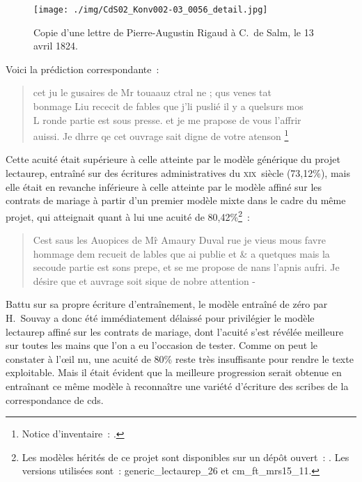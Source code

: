 \documentclass[a4paper,12pt,twoside]{book}
\newcommand{\siecle}[1]{\textsc{#1}\ieme}
\begin{document}
				\begin{figure}[!h]
					\centering
					\texttt{[image: ./img/CdS02\_Konv002-03\_0056\_detail.jpg]}%
					\caption{Copie d'une lettre de Pierre-Augustin Rigaud à C.~de Salm, le 13 avril 1824.}%
					\label{lettre-rigaud}%
				\end{figure}
				
				Voici la \gls{prédiction} correspondante~:
				
				\begin{quote}
					\textsf{cet ju le gusaires de Mr touaauz ctral ne ; qus venes tat\\
					bonmage Liu rececit de fables que j'li puslié il y a quelsurs mos\\
					L ronde partie est sous presse. et je me prapose de vous l'affrir\\
					auissi. Je dhrre qe cet ouvrage sait digne de votre atenson
					\footnote{Notice d'inventaire~: \cite{CdS02056}.}}
				\end{quote}
				
				Cette acuité était supérieure à celle atteinte par le modèle générique du projet \gls{lectaurep}, entraîné sur des écritures administratives du \siecle{xix}~siècle (73,12\%), mais elle était en revanche inférieure à celle atteinte par le modèle affiné sur les contrats de mariage à partir d'un premier modèle mixte dans le cadre du même projet, qui atteignait quant à lui une acuité de 80,42\%\footnote{Les modèles hérités de ce projet sont disponibles sur un dépôt ouvert~: \cite{KrakenModelsTranscription}. Les versions utilisées sont~: \textsf{generic\_lectaurep\_26} et \textsf{cm\_ft\_mrs15\_11}.}~:
				
				\begin{quote}
					\textsf{Cest saus les Auopices de M\^r Amaury Duval rue je vieus mous favre
					hommage dem recueit de lables que ai publie et \& a quetques mais
					la secoude partie est sons prepe, et se me propose de nans l'apnis
					aufri. Je désire que et auvrage soit sique de nobre attention -}
				\end{quote}
				
				Battu sur sa propre écriture d'entraînement, le modèle entraîné de zéro par H.~Souvay a donc été immédiatement délaissé pour privilégier le modèle \gls{lectaurep} affiné sur les contrats de mariage, dont l'acuité s'est révélée meilleure sur toutes les mains que l'on a eu l'occasion de tester. Comme on peut le constater à l'œil nu, une acuité de 80\% reste très insuffisante pour rendre le texte exploitable. Mais il était évident que la meilleure progression serait obtenue en entraînant ce même modèle à reconnaître une variété d'écriture des scribes de la correspondance de \gls{cds}.
				
\end{document}
